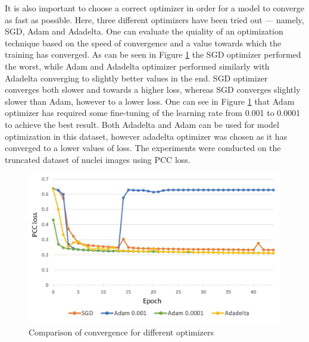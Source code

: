 It is also important to choose a correct optimizer in order for a model to converge as fast as possible. Here, three different optimizers have been tried out --- namely, SGD, Adam and Adadelta. One can evaluate the quiality of an optimization technique based on the speed of convergence and a value towards which the training has converged. As can be seen in Figure \ref{fig:optimizers} the SGD optimizer performed the worst, while Adam and Adadelta optimizer performed similarly with Adadelta converging to slightly better values in the end. SGD optimizer converges both slower and towards a higher loss, whereas SGD converges slightly slower than Adam, however to a lower loss. One can see in Figure \ref{fig:optimizers} that Adam optimizer has required some fine-tuning of the learning rate from 0.001 to 0.0001 to achieve the best result. Both Adadelta and Adam can be used for model optimization in this dataset, however adadelta optimizer was chosen as it has converged to a lower values of loss. The experiments were conducted on the truncated dataset of nuclei images using PCC loss.

\begin{figure}[H]
	\begin{center}
		\includegraphics[width=0.8\linewidth]{bilder/model training/optimizer-comparison.png}
		\caption{Comparison of convergence for different optimizers}\label{fig:optimizers}
	\end{center}
\end{figure}
